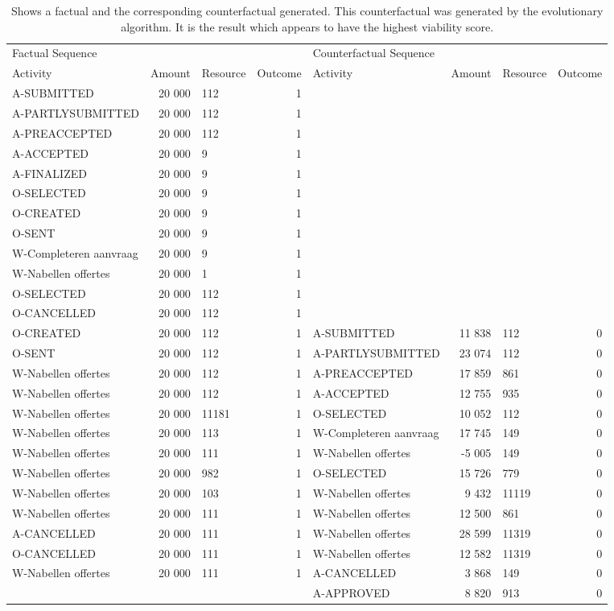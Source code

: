 \begin{table}
\caption{Shows a factual and the corresponding counterfactual generated. This counterfactual was generated by the evolutionary algorithm. It is the result which appears to have the highest viability score.}
\label{tbl:example-cf-evo}
\begin{tabular}{lrlrlrlr}
\toprule
\multicolumn{4}{l}{Factual Sequence} & \multicolumn{4}{l}{Counterfactual Sequence} \\
Activity & Amount & Resource & Outcome & Activity & Amount & Resource & Outcome \\
\midrule
A-SUBMITTED & 20 000 & 112 & 1 &  &  &  &  \\
A-PARTLYSUBMITTED & 20 000 & 112 & 1 &  &  &  &  \\
A-PREACCEPTED & 20 000 & 112 & 1 &  &  &  &  \\
A-ACCEPTED & 20 000 & 9 & 1 &  &  &  &  \\
A-FINALIZED & 20 000 & 9 & 1 &  &  &  &  \\
O-SELECTED & 20 000 & 9 & 1 &  &  &  &  \\
O-CREATED & 20 000 & 9 & 1 &  &  &  &  \\
O-SENT & 20 000 & 9 & 1 &  &  &  &  \\
W-Completeren aanvraag & 20 000 & 9 & 1 &  &  &  &  \\
W-Nabellen offertes & 20 000 & 1 & 1 &  &  &  &  \\
O-SELECTED & 20 000 & 112 & 1 &  &  &  &  \\
O-CANCELLED & 20 000 & 112 & 1 &  &  &  &  \\
O-CREATED & 20 000 & 112 & 1 & A-SUBMITTED & 11 838 & 112 & 0 \\
O-SENT & 20 000 & 112 & 1 & A-PARTLYSUBMITTED & 23 074 & 112 & 0 \\
W-Nabellen offertes & 20 000 & 112 & 1 & A-PREACCEPTED & 17 859 & 861 & 0 \\
W-Nabellen offertes & 20 000 & 112 & 1 & A-ACCEPTED & 12 755 & 935 & 0 \\
W-Nabellen offertes & 20 000 & 11181 & 1 & O-SELECTED & 10 052 & 112 & 0 \\
W-Nabellen offertes & 20 000 & 113 & 1 & W-Completeren aanvraag & 17 745 & 149 & 0 \\
W-Nabellen offertes & 20 000 & 111 & 1 & W-Nabellen offertes & -5 005 & 149 & 0 \\
W-Nabellen offertes & 20 000 & 982 & 1 & O-SELECTED & 15 726 & 779 & 0 \\
W-Nabellen offertes & 20 000 & 103 & 1 & W-Nabellen offertes & 9 432 & 11119 & 0 \\
W-Nabellen offertes & 20 000 & 111 & 1 & W-Nabellen offertes & 12 500 & 861 & 0 \\
A-CANCELLED & 20 000 & 111 & 1 & W-Nabellen offertes & 28 599 & 11319 & 0 \\
O-CANCELLED & 20 000 & 111 & 1 & W-Nabellen offertes & 12 582 & 11319 & 0 \\
W-Nabellen offertes & 20 000 & 111 & 1 & A-CANCELLED & 3 868 & 149 & 0 \\
 &  &  &  & A-APPROVED & 8 820 & 913 & 0 \\
\bottomrule
\end{tabular}
\end{table}
